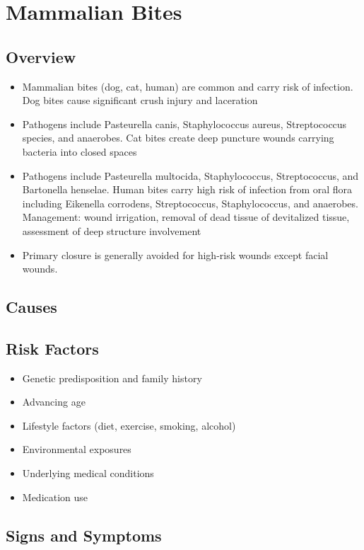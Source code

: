 \chapter{Mammalian Bites}
\label{sec:Mammalian Bites}

\section{Overview}


\begin{itemize}[noitemsep]
  \item Mammalian bites (dog, cat, human) are common and carry risk of infection. Dog bites cause significant crush injury and laceration
  \item Pathogens include Pasteurella canis, Staphylococcus aureus, Streptococcus species, and anaerobes. Cat bites create deep puncture wounds carrying bacteria into closed spaces
  \item Pathogens include Pasteurella multocida, Staphylococcus, Streptococcus, and Bartonella henselae. Human bites carry high risk of infection from oral flora including Eikenella corrodens, Streptococcus, Staphylococcus, and anaerobes. Management: wound irrigation, removal of dead tissue of devitalized tissue, assessment of deep structure involvement
  \item Primary closure is generally avoided for high-risk wounds except facial wounds.
\end{itemize}
\section{Causes}
\section{Risk Factors}

\begin{itemize}[noitemsep]
  \item Genetic predisposition and family history
  \item Advancing age
  \item Lifestyle factors (diet, exercise, smoking, alcohol)
  \item Environmental exposures
  \item Underlying medical conditions
  \item Medication use
\end{itemize}
\section{Signs and Symptoms}

